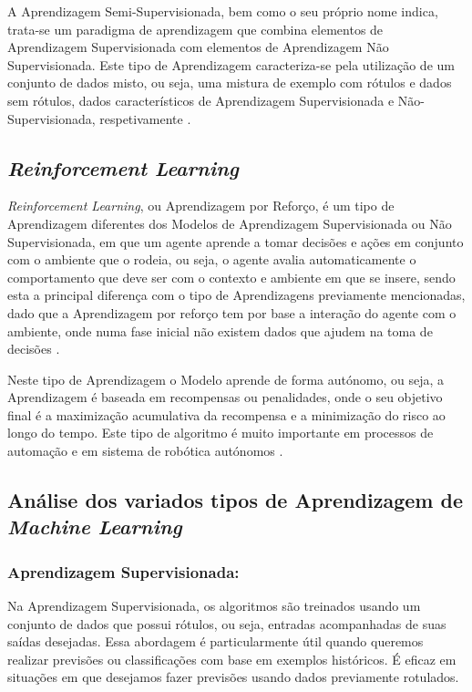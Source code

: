 \documentclass[12pt,a4paper,twoside]{report}
\begin{document}
{A Aprendizagem Semi-Supervisionada, bem como o seu próprio nome indica, trata-se um paradigma de aprendizagem que combina elementos de Aprendizagem Supervisionada com elementos de Aprendizagem Não Supervisionada. Este tipo de Aprendizagem caracteriza-se pela utilização de um conjunto de dados misto, ou seja, uma mistura de exemplo com rótulos e dados sem rótulos, dados característicos de Aprendizagem Supervisionada e Não-Supervisionada, respetivamente \cite{10.1007/s42979-021-00592-x}.

\subsection{\textit{Reinforcement Learning}}

\textit{Reinforcement Learning}, ou Aprendizagem por Reforço, é um tipo de Aprendizagem diferentes dos Modelos de Aprendizagem Supervisionada ou Não Supervisionada, em que um agente aprende a tomar decisões e ações em conjunto com o ambiente que o rodeia, ou seja, o agente avalia automaticamente o comportamento  que deve ser com o contexto e ambiente em que se insere, sendo esta a principal diferença com o tipo de Aprendizagens previamente mencionadas, dado que a Aprendizagem por reforço tem por base a interação do agente com o ambiente, onde numa fase inicial não existem dados que ajudem na toma de decisões \cite{10.1007/s42979-021-00592-x}.

Neste tipo de Aprendizagem o Modelo aprende de forma autónomo, ou seja, a Aprendizagem é baseada em recompensas ou penalidades, onde o seu objetivo final é a maximização acumulativa da recompensa e a minimização do risco ao longo do tempo. Este tipo de algoritmo é muito importante em processos de automação e em sistema de robótica autónomos \cite{10.1007/s42979-021-00592-x}.

\subsection{Análise dos variados tipos de Aprendizagem de \textit{Machine Learning}}

\subsubsection*{Aprendizagem Supervisionada:}
Na Aprendizagem Supervisionada, os algoritmos são treinados usando um conjunto de dados que possui rótulos, ou seja, entradas acompanhadas de suas saídas desejadas. Essa abordagem é particularmente útil quando queremos realizar previsões ou classificações com base em exemplos históricos. É eficaz em situações em que desejamos fazer previsões usando dados previamente rotulados.

}
\end{document}
